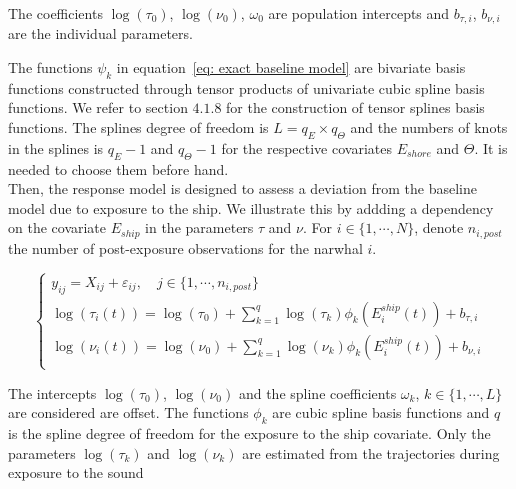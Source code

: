 \documentclass[11pt]{article}
\newcommand {\1}{\mathbb{1}}
\theoremstyle{definition}
\theoremstyle{remark}
\theoremstyle{remark}
\begin{document}
The coefficients $\log(\tau_{0})$, $\log(\nu_{0})$, $\omega_{0}$ are population intercepts and $b_{\tau,i}$, $b_{\nu,i}$
are the individual parameters. 

The functions $\psi_k$ in equation~\ref{eq: exact baseline model} are bivariate basis functions constructed through tensor products of univariate cubic spline basis functions. We refer to \cite{wood_generalized_2017} section $4.
1.8$ for the construction of tensor splines basis functions. The splines degree of freedom is $L=q_E \times q_{\Theta}$ and the numbers of knots in the splines is $q_E-1$ and $q_{\Theta}-1$ for the respective covariates $E_{shore}$ and $\Theta$. It is needed to choose them before hand.\\

Then, the response model is designed to assess a deviation from the baseline model due to exposure to the ship. We illustrate this by addding a dependency on the covariate $E_{ship}$ in the parameters $\tau$ and $\nu$. 
For $i \in \{1, \cdots, N\}$, denote $n_{i,post}$ the number of post-exposure observations for the narwhal $i$.

\begin{equation}   \left\{
	\begin{array}{l}
		y_{ij}=X_{ij}+\varepsilon_{ij}, \quad j \in \{1,\cdots,n_{i,post}\} \\
		\log(\tau_{i}(t))=\log(\tau_{0}) +\sum_{k=1}^{q} \log(\tau_{k})\phi_{k}(E^{ship}_i(t))+b_{\tau,i} \\
		\log(\nu_{i}(t))=\log(\nu_{0}) +  \sum_{k=1}^{q} \log(\nu_{k}) \phi_{k}(E^{ship}_i(t)) +b_{\nu,i}  \\
	\end{array}
	\right.
	\label{eq: exact response model}
\end{equation}

The intercepts $\log(\tau_0)$, $\log(\nu_0)$ and the spline coefficients $\omega_k$, $k \in \{1,\cdots,L\}$ are considered are offset.
The functions $\phi_k$ are cubic spline basis functions and $q$ is the spline degree of freedom for the exposure to the ship covariate. Only the parameters $\log(\tau_k)$ and $\log(\nu_k)$ are estimated from the trajectories during exposure to the sound
\end{document}
